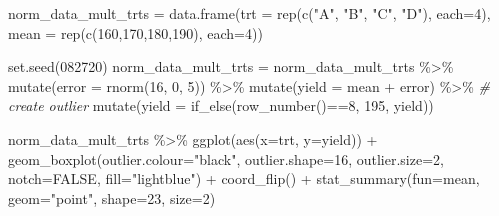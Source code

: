 \documentclass[
]{book}
\newenvironment{Shaded}{\begin{snugshade}}{\end{snugshade}}
\newcommand{\AttributeTok}[1]{\textcolor[rgb]{0.77,0.63,0.00}{#1}}
\newcommand{\CommentTok}[1]{\textcolor[rgb]{0.56,0.35,0.01}{\textit{#1}}}
\newcommand{\ConstantTok}[1]{\textcolor[rgb]{0.00,0.00,0.00}{#1}}
\newcommand{\DecValTok}[1]{\textcolor[rgb]{0.00,0.00,0.81}{#1}}
\newcommand{\FunctionTok}[1]{\textcolor[rgb]{0.00,0.00,0.00}{#1}}
\newcommand{\NormalTok}[1]{#1}
\newcommand{\OtherTok}[1]{\textcolor[rgb]{0.56,0.35,0.01}{#1}}
\newcommand{\SpecialCharTok}[1]{\textcolor[rgb]{0.00,0.00,0.00}{#1}}
\newcommand{\StringTok}[1]{\textcolor[rgb]{0.31,0.60,0.02}{#1}}
\begin{document}
\begin{Shaded}
\begin{Highlighting}[]
\NormalTok{norm\_data\_mult\_trts }\OtherTok{=} \FunctionTok{data.frame}\NormalTok{(}\AttributeTok{trt =} \FunctionTok{rep}\NormalTok{(}\FunctionTok{c}\NormalTok{(}\StringTok{"A"}\NormalTok{, }\StringTok{"B"}\NormalTok{, }\StringTok{"C"}\NormalTok{, }\StringTok{"D"}\NormalTok{), }\AttributeTok{each=}\DecValTok{4}\NormalTok{),}
                                 \AttributeTok{mean =} \FunctionTok{rep}\NormalTok{(}\FunctionTok{c}\NormalTok{(}\DecValTok{160}\NormalTok{,}\DecValTok{170}\NormalTok{,}\DecValTok{180}\NormalTok{,}\DecValTok{190}\NormalTok{), }\AttributeTok{each=}\DecValTok{4}\NormalTok{)) }

\FunctionTok{set.seed}\NormalTok{(}\DecValTok{082720}\NormalTok{)}
\NormalTok{norm\_data\_mult\_trts }\OtherTok{=}\NormalTok{ norm\_data\_mult\_trts }\SpecialCharTok{\%\textgreater{}\%}
  \FunctionTok{mutate}\NormalTok{(}\AttributeTok{error =} \FunctionTok{rnorm}\NormalTok{(}\DecValTok{16}\NormalTok{, }\DecValTok{0}\NormalTok{, }\DecValTok{5}\NormalTok{)) }\SpecialCharTok{\%\textgreater{}\%}
  \FunctionTok{mutate}\NormalTok{(}\AttributeTok{yield =}\NormalTok{ mean }\SpecialCharTok{+}\NormalTok{ error) }\SpecialCharTok{\%\textgreater{}\%}
  \CommentTok{\# create outlier}
  \FunctionTok{mutate}\NormalTok{(}\AttributeTok{yield =} \FunctionTok{if\_else}\NormalTok{(}\FunctionTok{row\_number}\NormalTok{()}\SpecialCharTok{==}\DecValTok{8}\NormalTok{, }\DecValTok{195}\NormalTok{, yield))}

\NormalTok{norm\_data\_mult\_trts }\SpecialCharTok{\%\textgreater{}\%}
        \FunctionTok{ggplot}\NormalTok{(}\FunctionTok{aes}\NormalTok{(}\AttributeTok{x=}\NormalTok{trt, }\AttributeTok{y=}\NormalTok{yield)) }\SpecialCharTok{+} 
        \FunctionTok{geom\_boxplot}\NormalTok{(}\AttributeTok{outlier.colour=}\StringTok{"black"}\NormalTok{, }\AttributeTok{outlier.shape=}\DecValTok{16}\NormalTok{,}
             \AttributeTok{outlier.size=}\DecValTok{2}\NormalTok{, }\AttributeTok{notch=}\ConstantTok{FALSE}\NormalTok{, }\AttributeTok{fill=}\StringTok{"lightblue"}\NormalTok{) }\SpecialCharTok{+}
        \FunctionTok{coord\_flip}\NormalTok{() }\SpecialCharTok{+}
        \FunctionTok{stat\_summary}\NormalTok{(}\AttributeTok{fun=}\NormalTok{mean, }\AttributeTok{geom=}\StringTok{"point"}\NormalTok{, }\AttributeTok{shape=}\DecValTok{23}\NormalTok{, }\AttributeTok{size=}\DecValTok{2}\NormalTok{)}
\end{Highlighting}
\end{Shaded}
\end{document}
